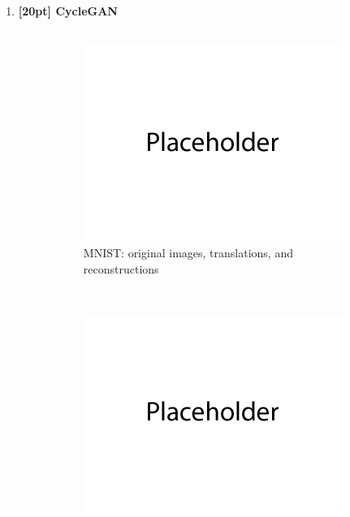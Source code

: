\documentclass{article}
\begin{document}
\newpage
{}
\begin{enumerate}

\item {\bf [20pt] CycleGAN} \\\\
\begin{figure}[H]
    \centering
    \begin{subfigure}{0.5\textwidth}
        \centering
        \includegraphics[width=\textwidth]{figures/qbonus_mnist.png}
        \caption{MNIST: original images, translations, and reconstructions}
    \end{subfigure}
    \\
    \begin{subfigure}{0.5\textwidth}
        \centering
        \includegraphics[width=\textwidth]{figures/qbonus_colored_mnist.png}

\end{subfigure}
\end{figure}
\end{enumerate}
\end{document}
